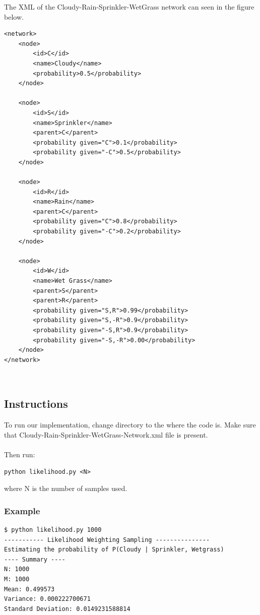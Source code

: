 \documentclass{article}
\begin{document}
The XML of the Cloudy-Rain-Sprinkler-WetGrass network can seen in the figure below.

\begin{minipage}{\linewidth}
\begin{lstlisting}
<network>
	<node>
		<id>C</id>
		<name>Cloudy</name>
		<probability>0.5</probability>
	</node>

	<node>
		<id>S</id>
		<name>Sprinkler</name>
		<parent>C</parent>
		<probability given="C">0.1</probability>
		<probability given="-C">0.5</probability>
	</node>
	
	<node>
		<id>R</id>
		<name>Rain</name>
		<parent>C</parent>
		<probability given="C">0.8</probability>
		<probability given="-C">0.2</probability>
	</node>
	
	<node>
		<id>W</id>
		<name>Wet Grass</name>
		<parent>S</parent>
		<parent>R</parent>
		<probability given="S,R">0.99</probability>
		<probability given="S,-R">0.9</probability>
		<probability given="-S,R">0.9</probability>
		<probability given="-S,-R">0.00</probability>
	</node>
</network>
\end{lstlisting}
\end{minipage}\\

\subsection{Instructions}
To run our implementation, change directory to the where the code is. Make sure that Cloudy-Rain-Sprinkler-WetGrass-Network.xml file is present.\\
\\
Then run:

\begin{lstlisting}
python likelihood.py <N>
\end{lstlisting}
where N is the number of samples used.\\

\subsubsection{Example}
\begin{lstlisting}
$ python likelihood.py 1000
----------- Likelihood Weighting Sampling ---------------
Estimating the probability of P(Cloudy | Sprinkler, Wetgrass)
---- Summary ----
N: 1000
M: 1000
Mean: 0.499573
Variance: 0.000222700671
Standard Deviation: 0.0149231588814

\end{lstlisting}
\end{document}
